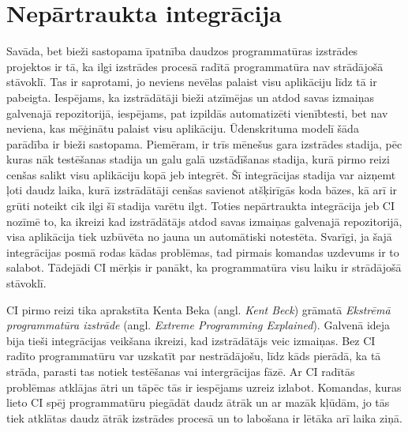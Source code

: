 \section{Nepārtraukta integrācija}
Savāda, bet bieži sastopama īpatnība daudzos programmatūras izstrādes projektos ir tā, ka ilgi izstrādes procesā radītā programmatūra nav strādājošā stāvoklī. Tas ir saprotami, jo neviens nevēlas palaist visu aplikāciju līdz tā ir pabeigta. Iespējams, ka izstrādātāji bieži atzīmējas un atdod savas izmaiņas galvenajā repozitorijā, iespējams, pat izpildās automatizēti vienībtesti, bet nav neviena, kas mēģinātu palaist visu aplikāciju. Ūdenskrituma modelī šāda parādība ir bieži sastopama. Piemēram, ir trīs mēnešus gara izstrādes stadija, pēc kuras nāk testēšanas stadija un galu galā uzstādīšanas stadija, kurā pirmo reizi cenšas salikt visu aplikāciju kopā jeb integrēt. Šī integrācijas stadija var aizņemt ļoti daudz laika, kurā izstrādātāji cenšas savienot atšķirīgās koda bāzes, kā arī ir grūti noteikt cik ilgi šī stadija varētu ilgt.
Toties nepārtraukta integrācija jeb CI  nozīmē to, ka ikreizi kad izstrādātājs atdod savas izmaiņas galvenajā repozitorijā, visa aplikācija tiek uzbūvēta no jauna un automātiski notestēta. Svarīgi, ja šajā integrācijas posmā rodas kādas problēmas, tad pirmais komandas uzdevums ir to salabot. Tādejādi CI mērķis ir panākt, ka programmatūra visu laiku ir strādājošā stāvoklī.

CI pirmo reizi tika aprakstīta Kenta Beka (angl. \textit{Kent Beck}) grāmatā \textit{Ekstrēmā programmatūra izstrāde} (angl. \textit{Extreme Programming Explained}). Galvenā ideja bija tieši integrācijas veikšana ikreizi, kad izstrādātājs veic izmaiņas. Bez CI radīto programmatūru var uzskatīt par nestrādājošu, līdz kāds pierādā, ka tā strāda, parasti tas notiek testēšanas vai intergrācijas fāzē. Ar CI radītās problēmas atklājas ātri un tāpēc tās ir iespējams uzreiz izlabot. Komandas, kuras lieto CI spēj programmatūru piegādāt daudz ātrāk un ar mazāk kļūdām, jo tās tiek atklātas daudz ātrāk izstrādes procesā un to labošana ir lētāka arī laika ziņā. \cite[3. nodaļa]{humble2010CD}
